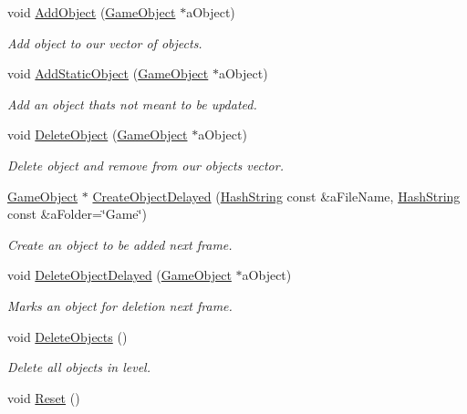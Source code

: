 \begin{DoxyCompactItemize}
void \hyperlink{classLevel_a776b738e16c5f9d1fd02107261404142}{Add\+Object} (\hyperlink{classGameObject}{Game\+Object} $\ast$a\+Object)
\begin{DoxyCompactList}\small\item\em Add object to our vector of objects. \end{DoxyCompactList}\item 
void \hyperlink{classLevel_a49a6d952c3d2cc6b9394fb55bf7af800}{Add\+Static\+Object} (\hyperlink{classGameObject}{Game\+Object} $\ast$a\+Object)
\begin{DoxyCompactList}\small\item\em Add an object that\textquotesingle{}s not meant to be updated. \end{DoxyCompactList}\item 
void \hyperlink{classLevel_a47ce3a6b9f0510d04cb62a470d6c724f}{Delete\+Object} (\hyperlink{classGameObject}{Game\+Object} $\ast$a\+Object)
\begin{DoxyCompactList}\small\item\em Delete object and remove from our objects vector. \end{DoxyCompactList}\item 
\hyperlink{classGameObject}{Game\+Object} $\ast$ \hyperlink{classLevel_a00c1353e785e71c20cc6f6470fc3a53f}{Create\+Object\+Delayed} (\hyperlink{classHashString}{Hash\+String} const \&a\+File\+Name, \hyperlink{classHashString}{Hash\+String} const \&a\+Folder=\char`\"{}Game\char`\"{})
\begin{DoxyCompactList}\small\item\em Create an object to be added next frame. \end{DoxyCompactList}\item 
void \hyperlink{classLevel_a5cc40ab9523c3383f828c5b8b637116a}{Delete\+Object\+Delayed} (\hyperlink{classGameObject}{Game\+Object} $\ast$a\+Object)
\begin{DoxyCompactList}\small\item\em Marks an object for deletion next frame. \end{DoxyCompactList}\item 
void \hyperlink{classLevel_ac0e88b911fb1039eb74f237022487356}{Delete\+Objects} ()
\begin{DoxyCompactList}\small\item\em Delete all objects in level. \end{DoxyCompactList}\item 
void \hyperlink{classLevel_abd143fd02f8959207315bdafd0be05ab}{Reset} ()

\end{DoxyCompactItemize}
